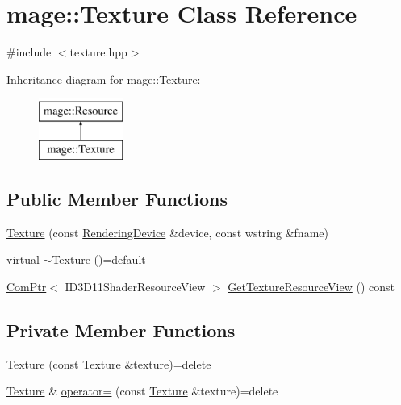 \hypertarget{classmage_1_1_texture}{}\section{mage\+:\+:Texture Class Reference}
\label{classmage_1_1_texture}


{\ttfamily \#include $<$texture.\+hpp$>$}

Inheritance diagram for mage\+:\+:Texture\+:\begin{figure}[H]
\begin{center}
\leavevmode
\includegraphics[height=2.000000cm]{classmage_1_1_texture}
\end{center}
\end{figure}
\subsection*{Public Member Functions}
\begin{DoxyCompactItemize}
\item 
\hyperlink{classmage_1_1_texture_a4af52927638604e184de30d8a13bc224}{Texture} (const \hyperlink{classmage_1_1_rendering_device}{Rendering\+Device} \&device, const wstring \&fname)
\item 
virtual \hyperlink{classmage_1_1_texture_a81664804ac0259e8c67851409ee106fa}{$\sim$\+Texture} ()=default
\item 
\hyperlink{namespacemage_ae74f374780900893caa5555d1031fd79}{Com\+Ptr}$<$ I\+D3\+D11\+Shader\+Resource\+View $>$ \hyperlink{classmage_1_1_texture_a95a4969f097f2cd46ddaf973d5637fbc}{Get\+Texture\+Resource\+View} () const
\end{DoxyCompactItemize}
\subsection*{Private Member Functions}
\begin{DoxyCompactItemize}
\item 
\hyperlink{classmage_1_1_texture_aed9e8ab5bc3efdeb381672fd4e243ea7}{Texture} (const \hyperlink{classmage_1_1_texture}{Texture} \&texture)=delete
\item 
\hyperlink{classmage_1_1_texture}{Texture} \& \hyperlink{classmage_1_1_texture_a0b73b4df98d729c8f60e58b0ca065636}{operator=} (const \hyperlink{classmage_1_1_texture}{Texture} \&texture)=delete
\end{DoxyCompactItemize}
